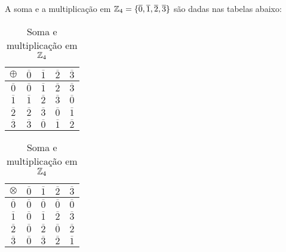 \begin{exemplo}
    A soma e a multiplica{\c c}{\~a}o em $\mathbb{Z}_4 = \{\overline{0},\overline{1},\overline{2},\overline{3}\}$
    s\~ao dadas nas tabelas abaixo:
        \begin{table}[!htb]
          \caption{Soma e multiplica\c{c}\~ao em $\mathbb{Z}_4$}
          \begin{minipage}{.5\linewidth}
            \centering
             \begin{tabular}{|c|c|c|c|c|}
                \hline
                $\oplus$ & $\overline{0}$ & $\overline{1}$ & $\overline{2}$ & $\overline{3}$\T\\
                \hline
                $\overline{0}$ & $\overline{0}$ & $\overline{1}$ & $\overline{2}$ & $\overline{3}$\T\\
                \hline
                $\overline{1}$ & $\overline{1}$ & $\overline{2}$ & $\overline{3}$ & $\overline{0}$\T\\
                \hline
                $\overline{2}$ & $\overline{2}$ & $\overline{3}$ & $\overline{0}$ & $\overline{1}$\T\\
                \hline
                $\overline{3}$ & $\overline{3}$ & $\overline{0}$ & $\overline{1}$ & $\overline{2}$\T\\
                \hline
            \end{tabular}
          \end{minipage}
          \begin{minipage}{.5\linewidth}
          \centering
            \begin{tabular}{|c|c|c|c|c|}
              \hline
              $\otimes$ & $\overline{0}$ & $\overline{1}$ & $\overline{2}$ & $\overline{3}$\T\\
              \hline
              $\overline{0}$ & $\overline{0}$ & $\overline{0}$ & $\overline{0}$ & $\overline{0}$\T\\
              \hline
              $\overline{1}$ & $\overline{0}$ & $\overline{1}$ & $\overline{2}$ & $\overline{3}$\T\\
              \hline
              $\overline{2}$ & $\overline{0}$ & $\overline{2}$ & $\overline{0}$ & $\overline{2}$\T\\
              \hline
              $\overline{3}$ & $\overline{0}$ & $\overline{3}$ & $\overline{2}$ & $\overline{1}$\T\\
              \hline
            \end{tabular}
        \end{minipage}
    \end{table}
\end{exemplo}

